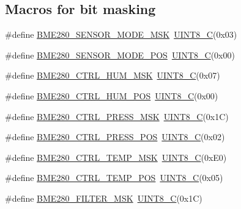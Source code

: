 \subsection*{Macros for bit masking}
\begin{DoxyCompactItemize}
\item 
\#define \hyperlink{group___b_m_e280_gaa8dbb21db223923e34d32c285a2a6660}{B\+M\+E280\+\_\+\+S\+E\+N\+S\+O\+R\+\_\+\+M\+O\+D\+E\+\_\+\+M\+SK}~\hyperlink{group___b_m_e280_gacd2aa09844a8a245cf7fdbb808e215e5}{U\+I\+N\+T8\+\_\+C}(0x03)
\item 
\#define \hyperlink{group___b_m_e280_ga20dfd35772ac7aff0f6ba4f0c7d8352e}{B\+M\+E280\+\_\+\+S\+E\+N\+S\+O\+R\+\_\+\+M\+O\+D\+E\+\_\+\+P\+OS}~\hyperlink{group___b_m_e280_gacd2aa09844a8a245cf7fdbb808e215e5}{U\+I\+N\+T8\+\_\+C}(0x00)
\item 
\#define \hyperlink{group___b_m_e280_gaf0b6595ecc184d00b061d06cc14b9a29}{B\+M\+E280\+\_\+\+C\+T\+R\+L\+\_\+\+H\+U\+M\+\_\+\+M\+SK}~\hyperlink{group___b_m_e280_gacd2aa09844a8a245cf7fdbb808e215e5}{U\+I\+N\+T8\+\_\+C}(0x07)
\item 
\#define \hyperlink{group___b_m_e280_ga90412039a144a430b9e6aeff23b63665}{B\+M\+E280\+\_\+\+C\+T\+R\+L\+\_\+\+H\+U\+M\+\_\+\+P\+OS}~\hyperlink{group___b_m_e280_gacd2aa09844a8a245cf7fdbb808e215e5}{U\+I\+N\+T8\+\_\+C}(0x00)
\item 
\#define \hyperlink{group___b_m_e280_ga579a2e3a1a74b90ccf28e50dae21d6e4}{B\+M\+E280\+\_\+\+C\+T\+R\+L\+\_\+\+P\+R\+E\+S\+S\+\_\+\+M\+SK}~\hyperlink{group___b_m_e280_gacd2aa09844a8a245cf7fdbb808e215e5}{U\+I\+N\+T8\+\_\+C}(0x1\+C)
\item 
\#define \hyperlink{group___b_m_e280_gaaed4e0278b7c828ed24100640a2d9a82}{B\+M\+E280\+\_\+\+C\+T\+R\+L\+\_\+\+P\+R\+E\+S\+S\+\_\+\+P\+OS}~\hyperlink{group___b_m_e280_gacd2aa09844a8a245cf7fdbb808e215e5}{U\+I\+N\+T8\+\_\+C}(0x02)
\item 
\#define \hyperlink{group___b_m_e280_gaf7371331e2fa7adb92322120ace956c2}{B\+M\+E280\+\_\+\+C\+T\+R\+L\+\_\+\+T\+E\+M\+P\+\_\+\+M\+SK}~\hyperlink{group___b_m_e280_gacd2aa09844a8a245cf7fdbb808e215e5}{U\+I\+N\+T8\+\_\+C}(0x\+E0)
\item 
\#define \hyperlink{group___b_m_e280_gae8c4ff4ea9185b90c3bd26a9e51c9ad9}{B\+M\+E280\+\_\+\+C\+T\+R\+L\+\_\+\+T\+E\+M\+P\+\_\+\+P\+OS}~\hyperlink{group___b_m_e280_gacd2aa09844a8a245cf7fdbb808e215e5}{U\+I\+N\+T8\+\_\+C}(0x05)
\item 
\#define \hyperlink{group___b_m_e280_ga2987fc2cac045851392c6be3adc97321}{B\+M\+E280\+\_\+\+F\+I\+L\+T\+E\+R\+\_\+\+M\+SK}~\hyperlink{group___b_m_e280_gacd2aa09844a8a245cf7fdbb808e215e5}{U\+I\+N\+T8\+\_\+C}(0x1\+C)

\end{DoxyCompactItemize}
